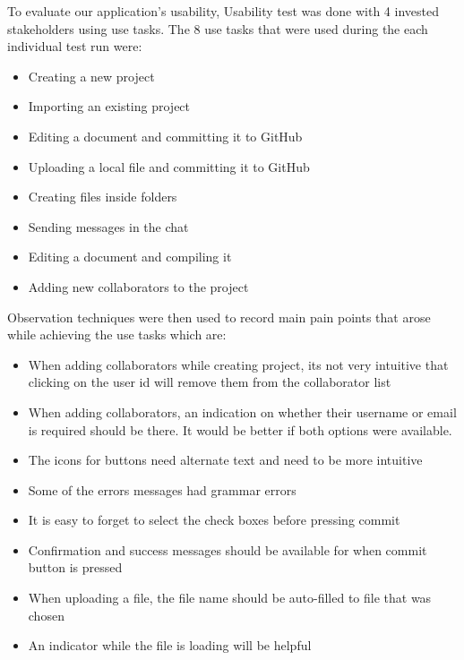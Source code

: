 \documentclass[12pt, titlepage]{article}
\begin{document}
	To evaluate our application's usability, Usability test was done with 4 invested stakeholders using use tasks. The 8 use tasks that were used during the each individual test run were:
	\begin{itemize}
		\item Creating a new project
		\item Importing an existing project
		\item Editing a document and committing it to GitHub
		\item Uploading a local file and committing it to GitHub
		\item Creating files inside folders
		\item Sending messages in the chat
		\item Editing a document and compiling it
		\item Adding new collaborators to the project
	\end{itemize}
	Observation techniques were then used to record main pain points that arose while achieving the use tasks which are:
	\begin{itemize}
		\item When adding collaborators while creating project, its not very intuitive that clicking on the user id will remove them from the collaborator list
		\item When adding collaborators, an indication on whether their username or email is required should be there. It would be better if both options were available.
		\item The icons for buttons need alternate text and need to be more intuitive
		\item Some of the errors messages had grammar errors
		\item It is easy to forget to select the check boxes before pressing commit
		\item Confirmation and success messages should be available for when commit button is pressed
		\item When uploading a file, the file name should be auto-filled to file that was chosen
		\item An indicator while the file is loading will be helpful
	\end{itemize}
	
\end{document}
